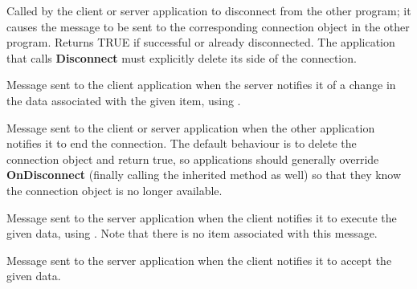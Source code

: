 
Called by the client or server application to disconnect from the
other program; it causes the  
message to be sent to the corresponding connection object in the
other program. Returns TRUE if successful or already disconnected.
The application that calls {\bf Disconnect} must explicitly delete
its side of the connection.

\label{wxddeconnectiononadvise}


Message sent to the client application when the server notifies
it of a change in the data associated with the given item, using
.

\label{wxddeconnectionondisconnect}


Message sent to the client or server application when the other
application notifies it to end the connection. The default
behaviour is to delete the connection object and return true, so
applications should generally override {\bf OnDisconnect}
(finally calling the inherited method as well) so that they know
the connection object is no longer available.

\label{wxddeconnectiononexecute}


Message sent to the server application when the client notifies
it to execute the given data, using .
Note that there is no item associated with this message.

\label{wxddeconnectiononpoke}


Message sent to the server application when the client notifies it to
accept the given data.

